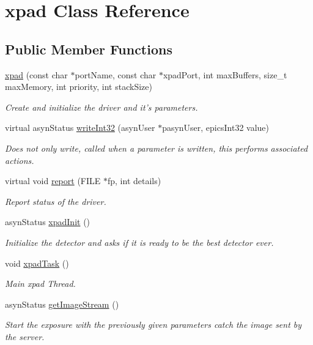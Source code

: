 \hypertarget{classxpad}{\section{xpad \-Class \-Reference}
\label{classxpad}
}
\subsection*{\-Public \-Member \-Functions}
\begin{DoxyCompactItemize}
\item 
\hyperlink{classxpad_aeef1391bfb5623f05113aea78e0c9271}{xpad} (const char $\ast$port\-Name, const char $\ast$xpad\-Port, int max\-Buffers, size\-\_\-t max\-Memory, int priority, int stack\-Size)
\begin{DoxyCompactList}\small\item\em \-Create and initialize the driver and it's parameters. \end{DoxyCompactList}\item 
virtual asyn\-Status \hyperlink{classxpad_a1b29d19584a2b16ce06c5d2dbd3fadef}{write\-Int32} (asyn\-User $\ast$pasyn\-User, epics\-Int32 value)
\begin{DoxyCompactList}\small\item\em \-Does not only write, called when a parameter is written, this performs associated actions. \end{DoxyCompactList}\item 
virtual void \hyperlink{classxpad_abb1726d4d8d836ed8337ff66639b2efd}{report} (\-F\-I\-L\-E $\ast$fp, int details)
\begin{DoxyCompactList}\small\item\em \-Report status of the driver. \end{DoxyCompactList}\item 
asyn\-Status \hyperlink{classxpad_a9265043d66a894cfc09b8cbfaec5840a}{xpad\-Init} ()
\begin{DoxyCompactList}\small\item\em \-Initialize the detector and asks if it is ready to be the best detector ever. \end{DoxyCompactList}\item 
void \hyperlink{classxpad_a62ee75efbfe797257aaee305fd34d9e4}{xpad\-Task} ()
\begin{DoxyCompactList}\small\item\em \-Main xpad \-Thread. \end{DoxyCompactList}\item 
asyn\-Status \hyperlink{classxpad_ad7bb20039316d5a9517f53de72580b5c}{get\-Image\-Stream} ()
\begin{DoxyCompactList}\small\item\em \-Start the exposure with the previously given parameters catch the image sent by the server. \end{DoxyCompactList}\end{DoxyCompactItemize}
